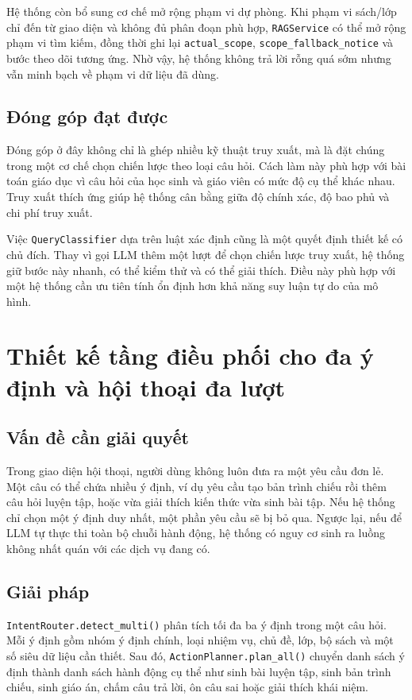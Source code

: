 \documentclass[../DoAn.tex]{subfiles}
\begin{document}
Hệ thống còn bổ sung cơ chế mở rộng phạm vi dự phòng. Khi phạm vi sách/lớp chỉ đến từ giao diện và không đủ phân đoạn phù hợp, \texttt{RAGService} có thể mở rộng phạm vi tìm kiếm, đồng thời ghi lại \texttt{actual\_scope}, \texttt{scope\_fallback\_notice} và bước theo dõi tương ứng. Nhờ vậy, hệ thống không trả lời rỗng quá sớm nhưng vẫn minh bạch về phạm vi dữ liệu đã dùng.

\subsection{Đóng góp đạt được}

Đóng góp ở đây không chỉ là ghép nhiều kỹ thuật truy xuất, mà là đặt chúng trong một cơ chế chọn chiến lược theo loại câu hỏi. Cách làm này phù hợp với bài toán giáo dục vì câu hỏi của học sinh và giáo viên có mức độ cụ thể khác nhau. Truy xuất thích ứng giúp hệ thống cân bằng giữa độ chính xác, độ bao phủ và chi phí truy xuất.

Việc \texttt{QueryClassifier} dựa trên luật xác định cũng là một quyết định thiết kế có chủ đích. Thay vì gọi LLM thêm một lượt để chọn chiến lược truy xuất, hệ thống giữ bước này nhanh, có thể kiểm thử và có thể giải thích. Điều này phù hợp với một hệ thống cần ưu tiên tính ổn định hơn khả năng suy luận tự do của mô hình.

\section{Thiết kế tầng điều phối cho đa ý định và hội thoại đa lượt}

\subsection{Vấn đề cần giải quyết}

Trong giao diện hội thoại, người dùng không luôn đưa ra một yêu cầu đơn lẻ. Một câu có thể chứa nhiều ý định, ví dụ yêu cầu tạo bản trình chiếu rồi thêm câu hỏi luyện tập, hoặc vừa giải thích kiến thức vừa sinh bài tập. Nếu hệ thống chỉ chọn một ý định duy nhất, một phần yêu cầu sẽ bị bỏ qua. Ngược lại, nếu để LLM tự thực thi toàn bộ chuỗi hành động, hệ thống có nguy cơ sinh ra luồng không nhất quán với các dịch vụ đang có.

\subsection{Giải pháp}

\texttt{IntentRouter.detect\_multi()} phân tích tối đa ba ý định trong một câu hỏi. Mỗi ý định gồm nhóm ý định chính, loại nhiệm vụ, chủ đề, lớp, bộ sách và một số siêu dữ liệu cần thiết. Sau đó, \texttt{ActionPlanner.plan\_all()} chuyển danh sách ý định thành danh sách hành động cụ thể như sinh bài luyện tập, sinh bản trình chiếu, sinh giáo án, chấm câu trả lời, ôn câu sai hoặc giải thích khái niệm.
\end{document}
